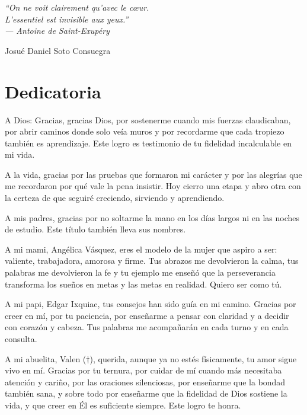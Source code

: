 \documentclass[11pt,letterpaper]{report}
\begin{document}
\vspace{1cm}

\begin{center}
\textit{``On ne voit clairement qu'avec le cœur. \\
L'essentiel est invisible aux yeux.''} \\
\textit{--- Antoine de Saint-Exupéry}
\end{center}

\vspace{1cm}

\begin{flushright}
Josué Daniel Soto Consuegra
\end{flushright}

\chapter*{Dedicatoria}
A Dios: Gracias, gracias Dios, por sostenerme cuando mis fuerzas claudicaban, 
por abrir caminos donde solo veía muros y por recordarme que cada tropiezo 
también es aprendizaje. Este logro es testimonio de tu fidelidad incalculable 
en mi vida.

A la vida, gracias por las pruebas que formaron mi carácter y por las alegrías 
que me recordaron por qué vale la pena insistir. Hoy cierro una etapa y abro 
otra con la certeza de que seguiré creciendo, sirviendo y aprendiendo.

A mis padres, gracias por no soltarme la mano en los días largos ni en las 
noches de estudio. Este título también lleva sus nombres.

A mi mami, Angélica Vásquez, eres el modelo de la mujer que aspiro a ser: 
valiente, trabajadora, amorosa y firme. Tus abrazos me devolvieron la calma, 
tus palabras me devolvieron la fe y tu ejemplo me enseñó que la perseverancia 
transforma los sueños en metas y las metas en realidad. Quiero ser como tú.

A mi papi, Edgar Ixquiac, tus consejos han sido guía en mi camino. Gracias por 
creer en mí, por tu paciencia, por enseñarme a pensar con claridad y a decidir 
con corazón y cabeza. Tus palabras me acompañarán en cada turno y en cada 
consulta.

A mi abuelita, Valen ($\dagger$), querida, aunque ya no estés físicamente, tu 
amor sigue vivo en mí. Gracias por tu ternura, por cuidar de mí cuando más 
necesitaba atención y cariño, por las oraciones silenciosas, por enseñarme que 
la bondad también sana, y sobre todo por enseñarme que la fidelidad de Dios 
sostiene la vida, y que creer en Él es suficiente siempre. Este logro te honra.
\end{document}
